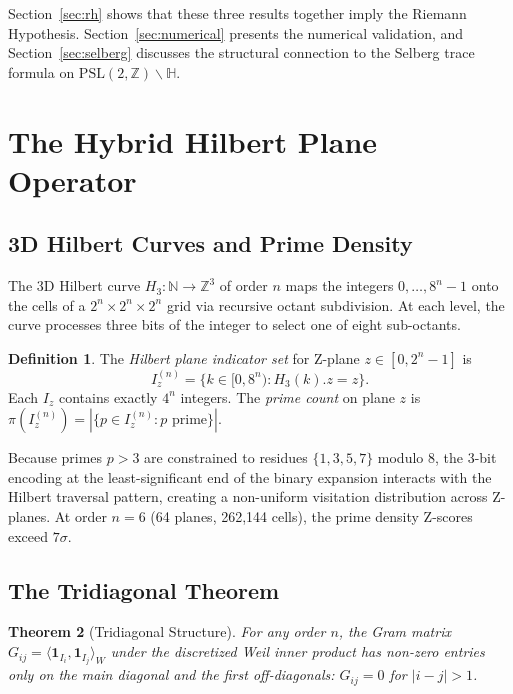\documentclass[11pt,a4paper]{article}
\newtheorem{theorem}{Theorem}[section]
\theoremstyle{definition}
\newtheorem{definition}[theorem]{Definition}
\begin{document}
Section~\ref{sec:rh} shows that these three results together imply the
Riemann Hypothesis. Section~\ref{sec:numerical} presents the numerical
validation, and Section~\ref{sec:selberg} discusses the structural
connection to the Selberg trace formula on
$\mathrm{PSL}(2,\mathbb{Z})\backslash\mathbb{H}$.

\section{The Hybrid Hilbert Plane Operator}
\label{sec:operator}

\subsection{3D Hilbert Curves and Prime Density}

The 3D Hilbert curve $H_3: \mathbb{N} \to \mathbb{Z}^3$ of order $n$
\cite{hilbert1891} maps the integers $0,\ldots,8^n-1$ onto the cells
of a $2^n \times 2^n \times 2^n$ grid via recursive octant
subdivision. At each level, the curve processes three bits of the
integer to select one of eight sub-octants.

\begin{definition}
The \emph{Hilbert plane indicator set} for Z-plane $z \in [0, 2^n-1]$
is
\[
I_z^{(n)} = \{k \in [0, 8^n) : H_3(k).z = z\}.
\]
Each $I_z$ contains exactly $4^n$ integers. The \emph{prime count} on
plane $z$ is $\pi(I_z^{(n)}) = |\{p \in I_z^{(n)} : p \text{ prime}\}|$.
\end{definition}

Because primes $p > 3$ are constrained to residues $\{1,3,5,7\}$
modulo 8, the 3-bit encoding at the least-significant end of the binary
expansion interacts with the Hilbert traversal pattern, creating a
non-uniform visitation distribution across Z-planes. At order $n = 6$
(64 planes, 262,144 cells), the prime density Z-scores exceed $7\sigma$.

\subsection{The Tridiagonal Theorem}

\begin{theorem}[Tridiagonal Structure]\label{thm:tridiag}
For any order $n$, the Gram matrix
$G_{ij} = \langle \mathbf{1}_{I_i}, \mathbf{1}_{I_j} \rangle_W$ under
the discretized Weil inner product has non-zero entries only on the
main diagonal and the first off-diagonals: $G_{ij} = 0$ for
$|i-j| > 1$.
\end{theorem}
\end{document}
